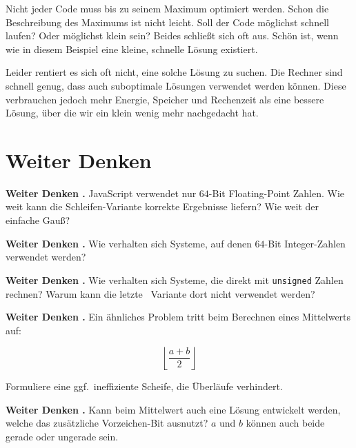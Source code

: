 \documentclass[a5paper,landscape,ngerman,10pt]{article}
\newcounter{aufgc}
\newenvironment{aufg}{\stepcounter{aufgc}\textbf{Weiter Denken \theaufgc.}\quad}{}
\begin{document}
Nicht jeder Code muss bis zu seinem Maximum optimiert
werden.
Schon die Beschreibung des Maximums ist nicht leicht.
Soll der Code möglichst schnell laufen?
Oder möglichst klein sein?
Beides schließt sich oft aus.
Schön ist, wenn wie in diesem Beispiel eine kleine,
schnelle Lösung existiert.

Leider rentiert es sich oft nicht, eine solche Lösung
zu suchen.
Die Rechner sind schnell genug, dass auch suboptimale
Lösungen verwendet werden können.
Diese verbrauchen jedoch mehr Energie, Speicher und
Rechenzeit als eine bessere Lösung, über die wir ein
klein wenig mehr nachgedacht hat.

\section{Weiter Denken}

\begin{aufg}
JavaScript verwendet nur $64$-Bit Floating-Point Zahlen.
Wie weit kann die Schleifen-Variante korrekte Ergebnisse
liefern? Wie weit der einfache Gauß?
\end{aufg}

\begin{aufg}
Wie verhalten sich Systeme, auf denen $64$-Bit Integer-Zahlen
verwendet werden?
\end{aufg}

\begin{aufg}
Wie verhalten sich Systeme, die direkt mit
\lstinline!unsigned! Zahlen rechnen?
Warum kann die letzte \cpp~Variante dort nicht verwendet werden?
\end{aufg}

\begin{aufg}
Ein ähnliches Problem tritt beim Berechnen eines Mittelwerts
auf:

\[\left\lfloor\frac{a+b}2\right\rfloor\]

Formuliere eine ggf.\ ineffiziente Scheife, die Überläufe verhindert.
\end{aufg}

\begin{aufg}
Kann beim Mittelwert auch eine Lösung entwickelt werden, welche
das zusätzliche Vorzeichen-Bit ausnutzt? $a$ und $b$ können auch beide
gerade oder ungerade sein.
\end{aufg}
\end{document}

